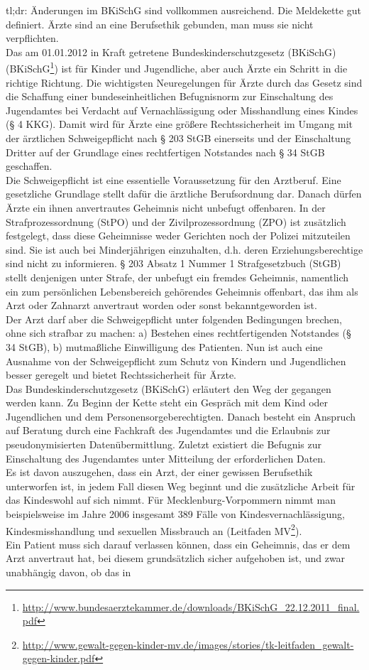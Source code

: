 tl;dr: Änderungen im BKiSchG sind vollkommen ausreichend. Die Meldekette gut definiert. Ärzte sind an eine Berufsethik gebunden, man muss sie nicht verpflichten.\\Das am 01.01.2012 in Kraft getretene Bundeskinderschutzgesetz (BKiSchG) (BKiSchG\footnote{\url{http://www.bundesaerztekammer.de/downloads/BKiSchG\_22.12.2011\_final.pdf}}) ist für Kinder und Jugendliche, aber auch Ärzte ein Schritt in die richtige Richtung. Die wichtigsten Neuregelungen für Ärzte durch das Gesetz sind die Schaffung einer bundeseinheitlichen Befugnisnorm zur Einschaltung des Jugendamtes bei Verdacht auf Vernachlässigung oder Misshandlung eines Kindes (§ 4 KKG). Damit wird für Ärzte eine größere Rechtssicherheit im Umgang mit der ärztlichen Schweigepflicht nach § 203 StGB einerseits und der Einschaltung Dritter auf der Grundlage eines rechtfertigen Notstandes nach § 34 StGB geschaffen.\\Die Schweigepflicht ist eine essentielle Voraussetzung für den Arztberuf. Eine gesetzliche Grundlage stellt dafür die ärztliche Berufsordnung dar. Danach dürfen Ärzte ein ihnen anvertrautes Geheimnis nicht unbefugt offenbaren. In der Strafprozessordnung (StPO) und der Zivilprozessordnung (ZPO) ist zusätzlich festgelegt, dass diese Geheimnisse weder Gerichten noch der Polizei mitzuteilen sind. Sie ist auch bei Minderjährigen einzuhalten, d.h. deren Erziehungsberechtige sind nicht zu informieren. § 203 Absatz 1 Nummer 1 Strafgesetzbuch (StGB) stellt denjenigen unter Strafe, der unbefugt ein fremdes Geheimnis, namentlich ein zum persönlichen Lebensbereich gehörendes Geheimnis offenbart, das ihm als Arzt oder Zahnarzt anvertraut worden oder sonst bekanntgeworden ist.\\Der Arzt darf aber die Schweigepflicht unter folgenden Bedingungen brechen, ohne sich strafbar zu machen: a) Bestehen eines rechtfertigenden Notstandes (§ 34 StGB), b) mutmaßliche Einwilligung des Patienten. Nun ist auch eine Ausnahme von der Schweigepflicht zum Schutz von Kindern und Jugendlichen besser geregelt und bietet Rechtssicherheit für Ärzte.\\Das Bundeskinderschutzgesetz (BKiSchG) erläutert den Weg der gegangen werden kann. Zu Beginn der Kette steht ein Gespräch mit dem Kind oder Jugendlichen und dem Personensorgeberechtigten. Danach besteht ein Anspruch auf Beratung durch eine Fachkraft des Jugendamtes und die Erlaubnis zur pseudonymisierten Datenübermittlung. Zuletzt existiert die Befugnis zur Einschaltung des Jugendamtes unter Mitteilung der erforderlichen Daten.\\Es ist davon auszugehen, dass ein Arzt, der einer gewissen Berufsethik unterworfen ist, in jedem Fall diesen Weg beginnt und die zusätzliche Arbeit für das Kindeswohl auf sich nimmt. Für Mecklenburg-Vorpommern nimmt man beispielsweise im Jahre 2006 insgesamt 389 Fälle von Kindesvernachlässigung, Kindesmisshandlung und sexuellen Missbrauch an (Leitfaden MV\footnote{\url{http://www.gewalt-gegen-kinder-mv.de/images/stories/tk-leitfaden\_gewalt-gegen-kinder.pdf}}).\\Ein Patient muss sich darauf verlassen können, dass ein Geheimnis, das er dem Arzt anvertraut hat, bei diesem grundsätzlich sicher aufgehoben ist, und zwar unabhängig davon, ob das in 